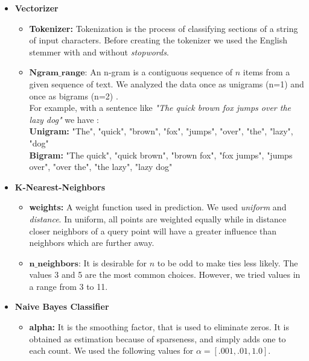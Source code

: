 \documentclass[11pt]{article}
\begin{document}
\begin{itemize}

\item{\textbf{Vectorizer}}
	\begin{itemize}

		\item{\textbf{Tokenizer:}} Tokenization is the process of classifying sections of a string of input characters. Before creating the tokenizer we used the 		English stemmer with and without \textit{stopwords}. 

	\item{$\textbf{Ngram\_range:}$}  An n-gram is a contiguous sequence of $n$ items from a given sequence of text. We analyzed the data once as unigrams 		(n=1) and once as bigrams (n=2) .\\
		For example, with a sentence like \textit{"The quick brown fox jumps over the lazy dog"} we have :\\
		\textbf{Unigram:} "The", "quick", "brown", "fox", "jumps", "over", "the", "lazy", "dog"\\
		\textbf{Bigram:} "The quick", "quick brown", "brown fox", "fox jumps", "jumps over", "over the", "the lazy", "lazy dog"
	
	\end{itemize}


\item{\textbf{K-Nearest-Neighbors}} 

	\begin{itemize}

		\item{\textbf{weights:}} A weight function used in prediction. We used \textit{uniform} and \textit{distance}. In 			uniform, all points are 				weighted equally while in distance closer neighbors of a query point will have a 		greater influence than neighbors which are further 				away.

		\item{$\textbf{n\_neighbors:}$}  It is desirable for $n$ to be odd to make ties less likely. The values 		3 and 5 are the most common choices. 				However, we tried values in a range from 3 to 11.	
	\end{itemize}

	
\item{\textbf{Naive Bayes Classifier}}

	\begin{itemize}

		\item{\textbf{alpha:}} It is the smoothing factor, that is used to eliminate zeros. It is obtained as estimation because of sparseness, and simply adds 		one to each count. We used the following values for $\alpha = [.001,.01,1.0]$.


\end{itemize}
\end{itemize}
\end{document}
